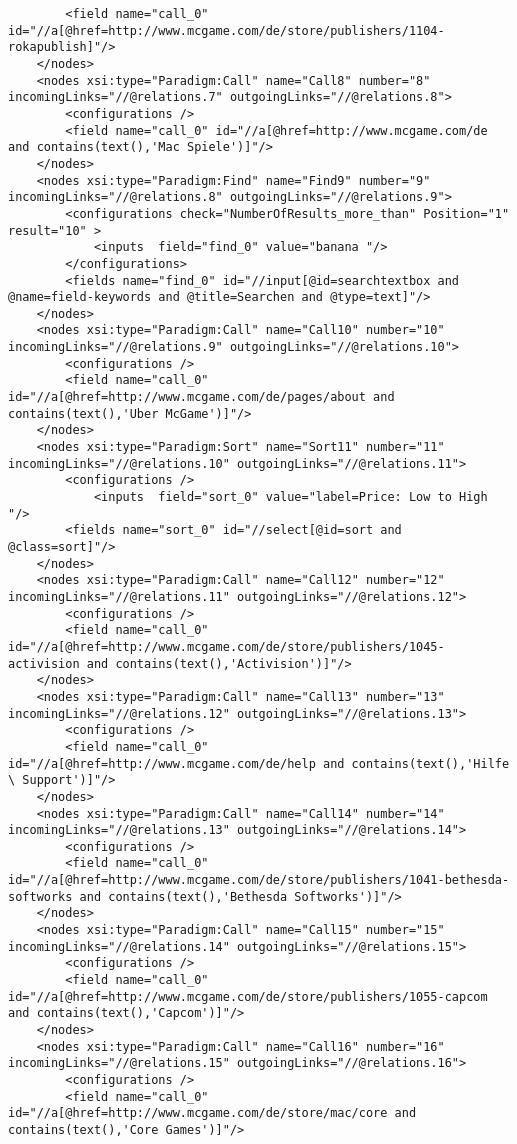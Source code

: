 \begin{lstlisting}
		<field name="call_0" id="//a[@href=http://www.mcgame.com/de/store/publishers/1104-rokapublish]"/>
	</nodes>
	<nodes xsi:type="Paradigm:Call" name="Call8" number="8" incomingLinks="//@relations.7" outgoingLinks="//@relations.8">
		<configurations />
		<field name="call_0" id="//a[@href=http://www.mcgame.com/de and contains(text(),'Mac Spiele')]"/>
	</nodes>
	<nodes xsi:type="Paradigm:Find" name="Find9" number="9" incomingLinks="//@relations.8" outgoingLinks="//@relations.9">
		<configurations check="NumberOfResults_more_than" Position="1" result="10" >
			<inputs  field="find_0" value="banana "/>
		</configurations>
		<fields name="find_0" id="//input[@id=searchtextbox and @name=field-keywords and @title=Searchen and @type=text]"/>
	</nodes>
	<nodes xsi:type="Paradigm:Call" name="Call10" number="10" incomingLinks="//@relations.9" outgoingLinks="//@relations.10">
		<configurations />
		<field name="call_0" id="//a[@href=http://www.mcgame.com/de/pages/about and contains(text(),'Uber McGame')]"/>
	</nodes>
	<nodes xsi:type="Paradigm:Sort" name="Sort11" number="11" incomingLinks="//@relations.10" outgoingLinks="//@relations.11">
		<configurations />
			<inputs  field="sort_0" value="label=Price: Low to High "/>
		<fields name="sort_0" id="//select[@id=sort and @class=sort]"/>
	</nodes>
	<nodes xsi:type="Paradigm:Call" name="Call12" number="12" incomingLinks="//@relations.11" outgoingLinks="//@relations.12">
		<configurations />
		<field name="call_0" id="//a[@href=http://www.mcgame.com/de/store/publishers/1045-activision and contains(text(),'Activision')]"/>
	</nodes>
	<nodes xsi:type="Paradigm:Call" name="Call13" number="13" incomingLinks="//@relations.12" outgoingLinks="//@relations.13">
		<configurations />
		<field name="call_0" id="//a[@href=http://www.mcgame.com/de/help and contains(text(),'Hilfe \ Support')]"/>
	</nodes>
	<nodes xsi:type="Paradigm:Call" name="Call14" number="14" incomingLinks="//@relations.13" outgoingLinks="//@relations.14">
		<configurations />
		<field name="call_0" id="//a[@href=http://www.mcgame.com/de/store/publishers/1041-bethesda-softworks and contains(text(),'Bethesda Softworks')]"/>
	</nodes>
	<nodes xsi:type="Paradigm:Call" name="Call15" number="15" incomingLinks="//@relations.14" outgoingLinks="//@relations.15">
		<configurations />
		<field name="call_0" id="//a[@href=http://www.mcgame.com/de/store/publishers/1055-capcom and contains(text(),'Capcom')]"/>
	</nodes>
	<nodes xsi:type="Paradigm:Call" name="Call16" number="16" incomingLinks="//@relations.15" outgoingLinks="//@relations.16">
		<configurations />
		<field name="call_0" id="//a[@href=http://www.mcgame.com/de/store/mac/core and contains(text(),'Core Games')]"/>

\end{lstlisting}
